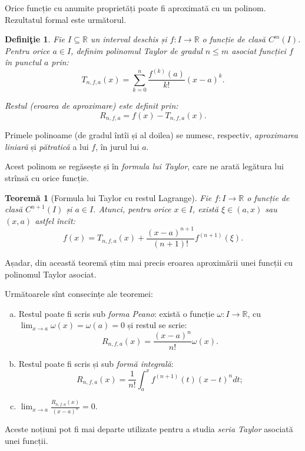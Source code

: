 \documentclass[11pt,a4paper]{article}
\newcommand\ds{\displaystyle}
\newcommand\seq{\subseteq}
\newcommand\RR{\mathbb{R}}
\theoremstyle{dotless}
\newtheorem{theorem}{Teorem\u{a}}[section]
\theoremstyle{dotlessdr}
\newtheorem{definition}{Defini\c{t}ie}[section]
\begin{document}
Orice funcție cu anumite proprietăți poate fi aproximată cu un polinom.
Rezultatul formal este următorul.

\begin{definition}\label{def:taylor-pol}
  Fie $I \seq \RR$ un interval deschis și $f : I \to \RR$ o funcție de clasă $C^m(I)$.
  Pentru orice $a \in I$, definim \emph{polinomul Taylor} de gradul $n \leq m$ asociat
  funcției $f$ în punctul $a$ prin:
  \[
    T_{n, f, a} (x) = \sum_{k = 0}^n \frac{f^{(k)}(a)}{k!} (x - a)^k.
  \]

  \emph{Restul} (eroarea de aproximare) este definit prin:
  \[
    R_{n, f, a} = f(x) - T_{n, f, a}(x).
  \]
\end{definition}

Primele polinoame (de gradul întîi și al doilea) se numesc, respectiv, \emph{aproximarea %
  liniară} și \emph{pătratică} a lui $f$, în jurul lui $a$.


Acest polinom se regăsește și în \emph{formula lui Taylor}, care ne arată legătura lui
strînsă cu orice funcție.

\begin{theorem}[Formula lui Taylor cu restul Lagrange]\label{thm:taylor-lagr}
  Fie $f : I \to \RR$ o funcție de clasă $C^{n+1}(I)$ și $a \in I$. Atunci, pentru orice
  $x \in I$, există $\xi \in (a, x)$ sau $(x, a)$ astfel încît:
  \[
    f(x) = T_{n, f, a}(x) + \frac{(x - a)^{n+1}}{(n + 1)!} f^{(n + 1)} (\xi).
  \]
\end{theorem}

Așadar, din această teoremă știm mai precis eroarea aproximării unei funcții cu polinomul
Taylor asociat.

Următoarele sînt consecințe ale teoremei:
\begin{enumerate}[(a)]
\item Restul poate fi scris sub \emph{forma Peano}: există o funcție $\omega : I \to \RR$,
  cu $\ds\lim_{x \to a} \omega(x) = \omega(a) = 0$ și restul se scrie:
  \[
    R_{n, f, a}(x) = \frac{(x - a)^n}{n!} \omega(x).
  \]
\item Restul poate fi scris și sub \emph{formă integrală}:
  \[
    R_{n, f, a}(x) = \frac{1}{n!} \int_a^x f^{(n + 1)}(t) (x - t)^n dt;
  \]
\item $\ds\lim_{x \to a} \frac{R_{n, f, a}(x)}{(x - a)^n} = 0$.
\end{enumerate}

Aceste noțiuni pot fi mai departe utilizate pentru a studia \emph{seria Taylor}
asociată unei funcții.
\end{document}
